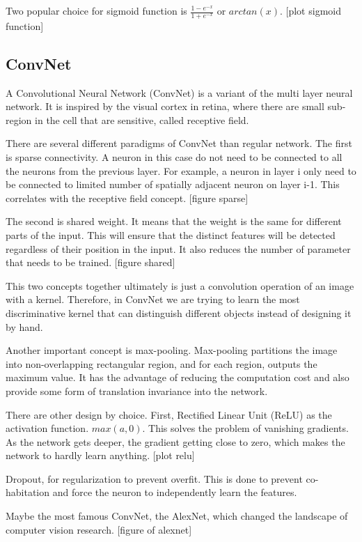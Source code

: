 \documentclass[a4paper,11pt]{kth-mag}
\begin{document}
Two popular choice for sigmoid function is $\frac{1-e^{-x}}{1+e^{-x}}$ or $arctan(x)$.
[plot sigmoid function]

\subsection{ConvNet}A Convolutional Neural Network (ConvNet) is a variant of the multi layer neural network. It is inspired by the visual cortex in retina, where there are small sub-region in the cell that are sensitive, called receptive field.

There are several different paradigms of ConvNet than regular network.
The first is sparse connectivity. A neuron in this case do not need to be connected to all the neurons from the previous layer. For example, a neuron in layer i only need to be connected to limited number of spatially adjacent neuron on layer i-1. This correlates with the receptive field concept.
[figure sparse]

The second is shared weight. It means that the weight is the same for different parts of the input. This will ensure that the distinct features will be detected regardless of their position in the input. It also reduces the number of parameter that needs to be trained.
[figure shared]

This two concepts together ultimately is just a convolution operation of an image with a kernel. Therefore, in ConvNet we are trying to learn the most discriminative kernel that can distinguish different objects instead of designing it by hand.

Another important concept is max-pooling. Max-pooling partitions the image into non-overlapping rectangular region, and for each region, outputs the maximum value. It has the advantage of reducing the computation cost and also provide some form of translation invariance into the network.

There are other design by choice.
First, Rectified Linear Unit (ReLU) as the activation function. $max(a, 0)$. This solves the problem of vanishing gradients. As the network gets deeper, the gradient getting close to zero, which makes the network to hardly learn anything.
[plot relu]

Dropout, for regularization to prevent overfit. This is done to prevent co-habitation and force the neuron to independently learn the features.

Maybe the most famous ConvNet, the AlexNet, which changed the landscape of computer vision research.
[figure of alexnet]
\end{document}
